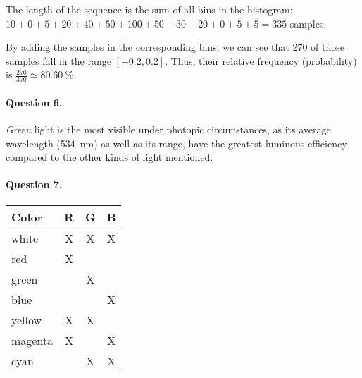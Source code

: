 The length of the sequence is the sum of all bins in the histogram:
$10 + 0 + 5 + 20 + 40 + 50 + 100 + 50 + 30 + 20 + 0 + 5 + 5 = 335$
samples.

By adding the samples in the corresponding bins, we can see that 270
of those samples fall in the range $[\num{-0.2}, \num{0.2}]$. Thus, their
relative frequency (probability) is $\frac{270}{370} \simeq
\SI{80.60}{\percent}$.

\paragraph{Question 6.}

\emph{Green} light is the most visible under photopic circumstances,
as its average wavelength (\SI{534}{\nano\meter}) as well as its range,
have the greatest luminous efficiency compared to the other kinds of
light mentioned.

\paragraph{Question 7.}

\begin{center}
\begin{tabular}{lccc}
\toprule
Color & R & G & B \\
\midrule
white   & X & X & X \\
red     & X &   &   \\
green   &   & X &   \\
blue    &   &   & X \\
yellow  & X & X &   \\
magenta & X &   & X \\
cyan    &   & X & X \\
\bottomrule
\end{tabular}
\end{center}

\finishpage

